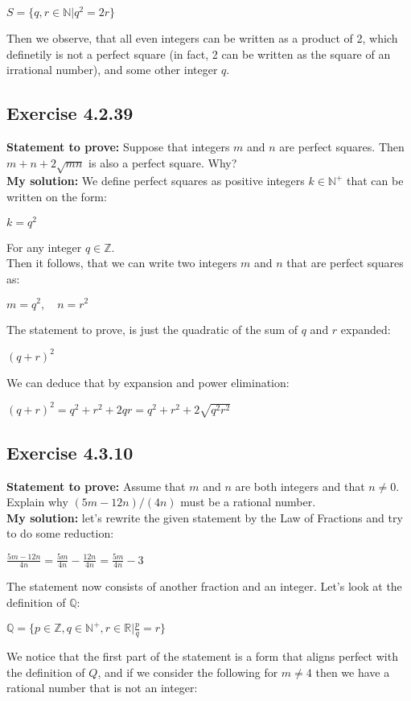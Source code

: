 \documentclass{report}
\newcommand{\cent}[1]{\begin{center}#1\end{center}}
\newcommand{\doubleR}{\mathbb{R}}
\newcommand{\doubleZ}{\mathbb{Z}}
\newcommand{\doubleN}{\mathbb{N}}
\newcommand{\doubleQ}{\mathbb{Q}}
\newcommand{\Prove}{\textbf{Statement to prove: }}
\newcommand{\solution}{\textbf{My solution: }}
\newcommand{\QED}{\boxed{}}
\newcommand{\Exercise}[1]{\subsection{Exercise #1}}
\begin{document}
	\cent{$S = \{q,r \in \doubleN | q^2 = 2r\}$}
	
	Then we observe, that all even integers can be written as  a product of 2, which definetily is not a perfect square (in fact, 2 can be written as the square of an irrational number), and some other integer $q$.\\
	\QED
	
	\Exercise{4.2.39}
	
	\Prove
	Suppose that integers $m$ and $n$ are perfect squares. Then $m+n+2\sqrt{mn}$ is also a perfect square. Why?\\
	
	\solution
	We define perfect squares as positive integers $k \in \doubleN^+$ that can be written on the form:
	
 	\cent{$k = q^2$}
 	
 	For any integer $q \in \doubleZ$.\\
 	
 	Then it follows, that we can write two integers $m$ and $n$ that are perfect squares as:
 	
 	\cent{$m = q^2, \quad n = r^2$}
	
	The statement to prove, is just the quadratic of the sum of $q$ and $r$ expanded:
	 \cent{$(q+r)^2$} 
	 
	 We can deduce that by expansion and power elimination:
	 
	\cent{$(q+r)^2 = q^2+r^2 + 2qr =q^2+r^2 + 2\sqrt{q^2 r^2} $}
	
	\QED	 
	
	\Exercise{4.3.10}
	
	\Prove
	Assume that $m$ and $n$ are both integers and that  $n\neq 0$. Explain why $(5m -12n)/(4n)$ must be a rational number.\\
	
	\solution
	let's rewrite the given statement by the Law of Fractions and try to do some reduction:
	
	\cent{$\frac{5m-12n}{4n} = \frac{5m}{4n} - \frac{12n}{4n} = \frac{5m}{4n} - 3 $}
	
	The statement now consists of another fraction and an integer. Let's look at the definition of $\doubleQ$:
	
	\cent{$\doubleQ = \{p \in \doubleZ, q \in \doubleN^+, r \in \doubleR | \frac{p}{q} = r\}$}
	
	We notice that the first part of the statement is a form that aligns perfect with the definition of $Q$, and if we consider the following for $m \neq 4$ then we have a rational number that is not an integer:
	
\end{document}

